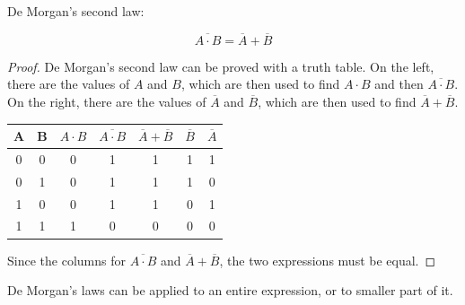             De Morgan's second law:
            \begin{theorem}
                \begin{equation}
                    \overline{A\cdot B}=\overline{A}+\overline{B}
                \end{equation}
            \end{theorem}
            \begin{proof}
                De Morgan's second law can be proved with a truth table.
                On the left, there are the values of $A$ and $B$, which are then used to find $A\cdot B$ and then $\overline{A\cdot B}$.
                On the right, there are the values of $\overline{A}$ and $\overline{B}$, which are then used to find $\overline{A}+\overline{B}$.
                \begin{center}
                    \begin{tabular}{c c|c c|c c c}
                        \textbf{A} & \textbf{B} & \textbf{$A\cdot B$} & \textbf{$\overline{A\cdot B}$} & \textbf{$\overline{A}+\overline{B}$} & \textbf{$\overline{B}$} & \textbf{$\overline{A}$} \\
                        \hline
                        0 & 0 & 0 & 1 & 1 & 1 & 1 \\
                        0 & 1 & 0 & 1 & 1 & 1 & 0 \\
                        1 & 0 & 0 & 1 & 1 & 0 & 1 \\
                        1 & 1 & 1 & 0 & 0 & 0 & 0
                    \end{tabular}
                \end{center}
                Since the columns for $\overline{A\cdot B}$ and $\overline{A}+\overline{B}$, the two expressions must be equal.
            \end{proof}

            De Morgan's laws can be applied to an entire expression, or to smaller part of it.

